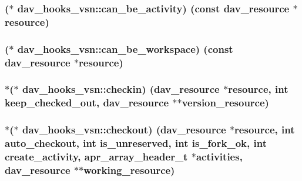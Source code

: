 \subsubsection[{\texorpdfstring{can\+\_\+be\+\_\+activity}{can_be_activity}}]{($\ast$ dav\+\_\+hooks\+\_\+vsn\+::can\+\_\+be\+\_\+activity) (const {\bf dav\+\_\+resource} $\ast${\bf resource})}\hypertarget{structdav__hooks__vsn_a168825429295acfdae39754af51041c9}{}\label{structdav__hooks__vsn_a168825429295acfdae39754af51041c9}
\subsubsection[{\texorpdfstring{can\+\_\+be\+\_\+workspace}{can_be_workspace}}]{($\ast$ dav\+\_\+hooks\+\_\+vsn\+::can\+\_\+be\+\_\+workspace) (const {\bf dav\+\_\+resource} $\ast${\bf resource})}\hypertarget{structdav__hooks__vsn_a218a86ae426b1e3cbb214c1c4d754bf3}{}\label{structdav__hooks__vsn_a218a86ae426b1e3cbb214c1c4d754bf3}
\subsubsection[{\texorpdfstring{checkin}{checkin}}]{$\ast$($\ast$ dav\+\_\+hooks\+\_\+vsn\+::checkin) ({\bf dav\+\_\+resource} $\ast${\bf resource}, {\bf int} keep\+\_\+checked\+\_\+out, {\bf dav\+\_\+resource} $\ast$$\ast$version\+\_\+resource)}\hypertarget{structdav__hooks__vsn_aa049d7f842da9e7560c5dc9b324a08df}{}\label{structdav__hooks__vsn_aa049d7f842da9e7560c5dc9b324a08df}
\subsubsection[{\texorpdfstring{checkout}{checkout}}]{$\ast$($\ast$ dav\+\_\+hooks\+\_\+vsn\+::checkout) ({\bf dav\+\_\+resource} $\ast${\bf resource}, {\bf int} auto\+\_\+checkout, {\bf int} is\+\_\+unreserved, {\bf int} is\+\_\+fork\+\_\+ok, {\bf int} create\+\_\+activity, {\bf apr\+\_\+array\+\_\+header\+\_\+t} $\ast$activities, {\bf dav\+\_\+resource} $\ast$$\ast$working\+\_\+resource)}\hypertarget{structdav__hooks__vsn_aa9d97694d7d1efe8275d6749e95708c4}{}\label{structdav__hooks__vsn_aa9d97694d7d1efe8275d6749e95708c4}

